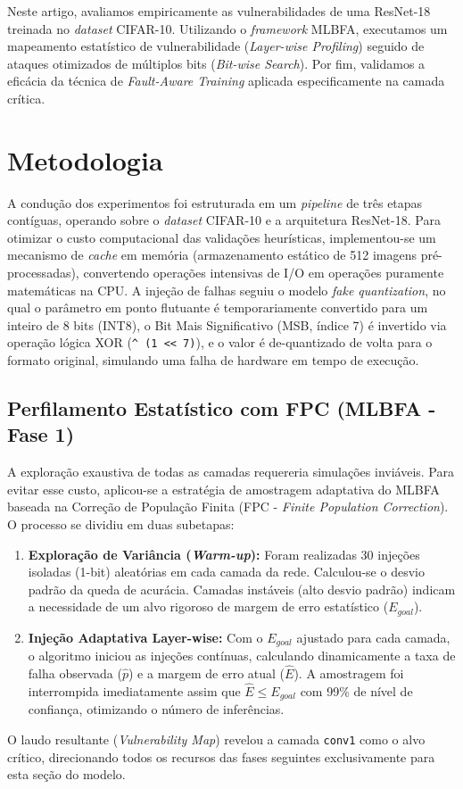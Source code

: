\documentclass[11pt, a4paper]{article}
\begin{document}
Neste artigo, avaliamos empiricamente as vulnerabilidades de uma ResNet-18 treinada no \textit{dataset} CIFAR-10. Utilizando o \textit{framework} MLBFA, executamos um mapeamento estatístico de vulnerabilidade (\textit{Layer-wise Profiling}) seguido de ataques otimizados de múltiplos bits (\textit{Bit-wise Search}). Por fim, validamos a eficácia da técnica de \textit{Fault-Aware Training} aplicada especificamente na camada crítica.

\section{Metodologia}

A condução dos experimentos foi estruturada em um \textit{pipeline} de três etapas contíguas, operando sobre o \textit{dataset} CIFAR-10 e a arquitetura ResNet-18. Para otimizar o custo computacional das validações heurísticas, implementou-se um mecanismo de \textit{cache} em memória (armazenamento estático de 512 imagens pré-processadas), convertendo operações intensivas de I/O em operações puramente matemáticas na CPU. A injeção de falhas seguiu o modelo \textit{fake quantization}, no qual o parâmetro em ponto flutuante é temporariamente convertido para um inteiro de 8 bits (INT8), o Bit Mais Significativo (MSB, índice 7) é invertido via operação lógica XOR (\texttt{\^{} (1 << 7)}), e o valor é de-quantizado de volta para o formato original, simulando uma falha de hardware em tempo de execução.

\subsection{Perfilamento Estatístico com FPC (MLBFA - Fase 1)}
A exploração exaustiva de todas as camadas requereria simulações inviáveis. Para evitar esse custo, aplicou-se a estratégia de amostragem adaptativa do MLBFA baseada na Correção de População Finita (FPC - \textit{Finite Population Correction}). O processo se dividiu em duas subetapas:
\begin{enumerate}
    \item \textbf{Exploração de Variância (\textit{Warm-up}):} Foram realizadas 30 injeções isoladas (1-bit) aleatórias em cada camada da rede. Calculou-se o desvio padrão da queda de acurácia. Camadas instáveis (alto desvio padrão) indicam a necessidade de um alvo rigoroso de margem de erro estatístico ($E_{goal}$).
    \item \textbf{Injeção Adaptativa Layer-wise:} Com o $E_{goal}$ ajustado para cada camada, o algoritmo iniciou as injeções contínuas, calculando dinamicamente a taxa de falha observada ($\hat{p}$) e a margem de erro atual ($\hat{E}$). A amostragem foi interrompida imediatamente assim que $\hat{E} \leq E_{goal}$ com 99\% de nível de confiança, otimizando o número de inferências.
\end{enumerate}
O laudo resultante (\textit{Vulnerability Map}) revelou a camada \texttt{conv1} como o alvo crítico, direcionando todos os recursos das fases seguintes exclusivamente para esta seção do modelo.
\end{document}
